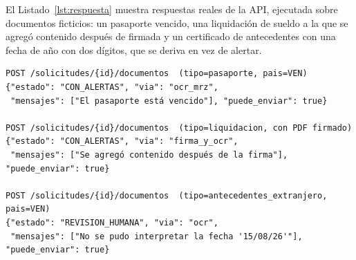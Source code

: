 \documentclass[11pt,a4paper]{article}
\begin{document}
El Listado~\ref{lst:respuesta} muestra respuestas reales de la API, ejecutada sobre documentos ficticios: un pasaporte vencido, una liquidación de sueldo a la que se agregó contenido después de firmada y un certificado de antecedentes con una fecha de año con dos dígitos, que se deriva en vez de alertar.

\begin{lstlisting}[caption={Respuestas de la API de la maqueta al solicitante (documentos ficticios).},label={lst:respuesta},captionpos=b]
POST /solicitudes/{id}/documentos  (tipo=pasaporte, pais=VEN)
{"estado": "CON_ALERTAS", "via": "ocr_mrz",
 "mensajes": ["El pasaporte está vencido"], "puede_enviar": true}

POST /solicitudes/{id}/documentos  (tipo=liquidacion, con PDF firmado)
{"estado": "CON_ALERTAS", "via": "firma_y_ocr",
 "mensajes": ["Se agregó contenido después de la firma"], "puede_enviar": true}

POST /solicitudes/{id}/documentos  (tipo=antecedentes_extranjero, pais=VEN)
{"estado": "REVISION_HUMANA", "via": "ocr",
 "mensajes": ["No se pudo interpretar la fecha '15/08/26'"], "puede_enviar": true}
\end{lstlisting}
\end{document}
